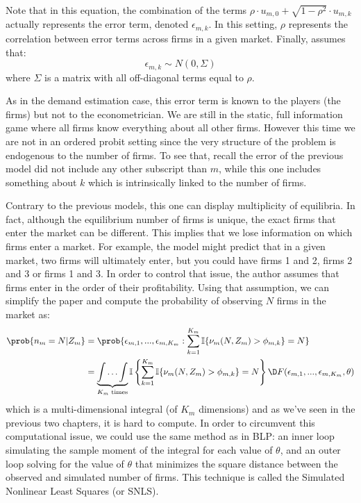 Note that in this equation, the combination of the terms $\rho \cdot u_{m,0} + \sqrt{1 - \rho^2}\cdot u_{m,k} $ actually represents the error term, denoted $\epsilon_{m,k}$. In this setting, $\rho$ represents the correlation between error terms across firms in a given market. Finally, \cite{berry_92} assumes that: $$\epsilon_{m,k} \sim N(0, \Sigma) $$ where $\Sigma$ is a matrix with all off-diagonal terms equal to $\rho$.

As in the demand estimation case, this error term is known to the players (the firms) but not to the econometrician. We are still in the static, full information game where all firms know everything about all other firms. However this time we are not in an ordered probit setting since the very structure of the problem is endogenous to the number of firms. To see that, recall the error of the previous model did not include any other subscript than $m$, while this one includes something about $k$ which is intrinsically linked to the number of firms.

Contrary to the previous models, this one can display multiplicity of equilibria. In fact, although the equilibrium number of firms is unique, the exact firms that enter the market can be different. This implies that we lose information on which firms enter a market. For example, the model might predict that in a given market, two firms will ultimately enter, but you could have firms 1 and 2, firms 2 and 3 or firms 1 and 3. In order to control that issue, the author assumes that firms enter in the order of their profitability. Using that assumption, we can simplify the paper and compute the probability of observing $N$ firms in the market as: \begin{align*}
\prob{n_m = N\vert Z_m} & = \prob{\epsilon_{m,1}, ..., \epsilon_{m,K_m} : \sum_{k=1}^{K_m}\mathbb{I}\{\nu_m(N, Z_m) >\phi_{m,k}\} = N } \\
& = \underbrace{\int\hdots\int}_{K_m\text{ times}}\mathbb{I}\left\lbrace\sum_{k=1}^{K_m}\mathbb{I}\{\nu_m(N, Z_m) >\phi_{m,k}\} = N\right\rbrace\D F(\epsilon_{m,1}, ..., \epsilon_{m,K_m}, \theta)
\end{align*} which is a multi-dimensional integral (of $K_m$ dimensions) and as we've seen in the previous two chapters, it is hard to compute. In order to circumvent this computational issue, we could use the same method as in BLP: an inner loop simulating the sample moment of the integral for each value of $\theta$, and an outer loop solving for the value of $\theta$ that minimizes the square distance between the observed and simulated number of firms. This technique is called the Simulated Nonlinear Least Squares (or SNLS).

